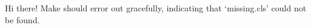 \documentclass{missing}
\begin{document}
Hi there!  Make should error out gracefully, indicating that `missing.cls' could not be found.
\end{document}
